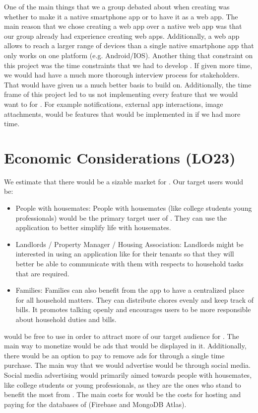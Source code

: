 \documentclass{article}
\begin{document}
One of the main things that we a group debated about when creating \progname{} was whether to make it a native smartphone app or to have it as a web app. The main reason that we chose creating a web app over a native web app was that our group already had experience creating web apps. Additionally, a web app allows \progname{} to reach a larger range of devices than a single native smartphone app that only works on one platform (e.g. Android/IOS). Another thing that constraint on this project was the time constraints that we had to develop \progname{}. If given more time, we would had have a much more thorough interview process for stakeholders. That would have given us a much better basis to build \progname{} on. Additionally, the time frame of this project led to us not implementing every feature that we would want to for \progname{}. For example notifications, external app interactions, image attachments, would be features that would be implemented in \progname{} if we had more time.

\section{Economic Considerations (LO23)}

We estimate that there would be a sizable market for \progname{}. Our target users would be:

\begin{itemize}
  \item People with housemates: People with housemates (like college students young professionals) would be the primary target user of \progname{}. They can use the application to better simplify life with housemates.
  \item Landlords / Property Manager / Housing Association:  Landlords might be interested in using an application like \progname{} for their tenants so that they will better be able to communicate with them with respects to household tasks that are required.
  \item Families: Families can also benefit from the app to have a centralized place for all household matters. They can distribute chores evenly and keep track of bills. It promotes talking openly and encourages users to be more responsible about household duties and bills.
\end{itemize}

\progname{} would be free to use in order to attract more of our target audience for \progname{}. The main way to monetize \progname{} would be ads that would be displayed in it. Additionally, there would be an option to pay to remove ads for \progname{} through a single time purchase. The main way that we would advertise \progname{} would be through social media. Social media advertising would primarily aimed towards people with housemates, like college students or young professionals, as they are the ones who stand to benefit the most from \progname{}.  The main costs for \progname{} would be the costs for hosting \progname{} and paying for the databases of \progname{} (Firebase and MongoDB Atlas).
\end{document}
